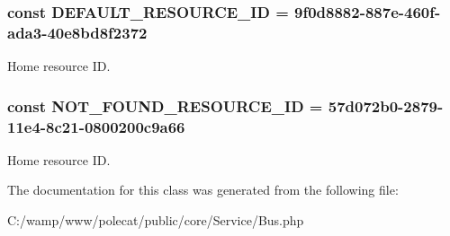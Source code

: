\subsubsection[{D\+E\+F\+A\+U\+L\+T\+\_\+\+R\+E\+S\+O\+U\+R\+C\+E\+\_\+\+I\+D}]{\setlength{\rightskip}{0pt plus 5cm}const D\+E\+F\+A\+U\+L\+T\+\_\+\+R\+E\+S\+O\+U\+R\+C\+E\+\_\+\+I\+D = \textquotesingle{}9f0d8882-\/887e-\/460f-\/ada3-\/40e8bd8f2372\textquotesingle{}}\label{class_able_polecat___service___bus_a6812e1b07c5d6333a734e863afdd3231}
\textquotesingle{}Home\textquotesingle{} resource I\+D. \hypertarget{class_able_polecat___service___bus_a9df65a1efe90e8bb8d0e234da978a2db}{}
\subsubsection[{N\+O\+T\+\_\+\+F\+O\+U\+N\+D\+\_\+\+R\+E\+S\+O\+U\+R\+C\+E\+\_\+\+I\+D}]{\setlength{\rightskip}{0pt plus 5cm}const N\+O\+T\+\_\+\+F\+O\+U\+N\+D\+\_\+\+R\+E\+S\+O\+U\+R\+C\+E\+\_\+\+I\+D = \textquotesingle{}57d072b0-\/2879-\/11e4-\/8c21-\/0800200c9a66\textquotesingle{}}\label{class_able_polecat___service___bus_a9df65a1efe90e8bb8d0e234da978a2db}
\textquotesingle{}Home\textquotesingle{} resource I\+D. 

The documentation for this class was generated from the following file\+:\begin{DoxyCompactItemize}
\item 
C\+:/wamp/www/polecat/public/core/\+Service/Bus.\+php\end{DoxyCompactItemize}
